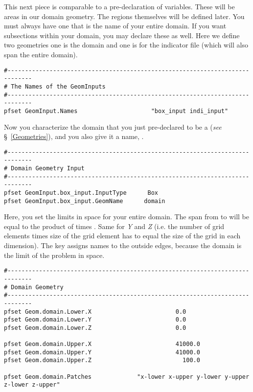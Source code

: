 This next piece is comparable to a pre-declaration of variables.  These will be areas in our domain geometry. 
The regions themselves will be defined later.  You must always have one that is the name of your entire domain.  
If you want subsections within your domain, you may declare these as well. Here we define two geometries one is the
domain and one is for the indicator file (which will also span the entire domain).

\begin{verbatim}
#-----------------------------------------------------------------------------
# The Names of the GeomInputs
#-----------------------------------------------------------------------------
pfset GeomInput.Names                     "box_input indi_input"
\end{verbatim}

Now you characterize the domain that you just pre-declared to be a  (\emph{see} \S~\ref{Geometries}),
and you also give it a name, .

\begin{verbatim}
#-----------------------------------------------------------------------------
# Domain Geometry Input
#-----------------------------------------------------------------------------
pfset GeomInput.box_input.InputType      Box
pfset GeomInput.box_input.GeomName      domain
\end{verbatim}

Here, you set the limits in space for your entire domain.  The span from  to  
will be equal to the product of  times .  
Same for {\em Y} and {\em Z} (i.e. the number of grid elements times size of the grid element has to
equal the size of the grid in each dimension).   The  key assigns names to the outside edges, 
because the domain is the limit of the problem in space.

\begin{verbatim}
#-----------------------------------------------------------------------------
# Domain Geometry 
#-----------------------------------------------------------------------------
pfset Geom.domain.Lower.X                        0.0
pfset Geom.domain.Lower.Y                        0.0
pfset Geom.domain.Lower.Z                        0.0
 
pfset Geom.domain.Upper.X                        41000.0
pfset Geom.domain.Upper.Y                        41000.0
pfset Geom.domain.Upper.Z                          100.0

pfset Geom.domain.Patches             "x-lower x-upper y-lower y-upper z-lower z-upper"
\end{verbatim}

